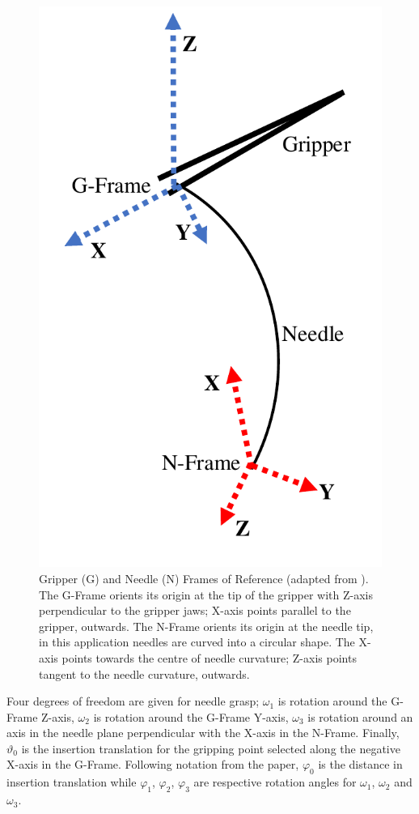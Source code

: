 \documentclass[english]{sobraep}
\begin{document}
\begin{figure}
    \centering
    \includegraphics[scale=0.4]{figs/needle-frames.pdf}
    \caption{Gripper (G) and Needle (N) Frames of Reference (adapted from \cite[Figure 2(a)]{needle-grasp}). The G-Frame orients its origin at the tip of the gripper with Z-axis perpendicular to the gripper jaws; X-axis points parallel to the gripper, outwards. The N-Frame orients its origin at the needle tip, in this application needles are curved into a circular shape. The X-axis points towards the centre of needle curvature; Z-axis points tangent to the needle curvature, outwards.}
    \label{fig:needle-frames}
\end{figure}
\par{Four degrees of freedom are given for needle grasp; $\omega_{1}$ is rotation around the G-Frame Z-axis, $\omega_{2}$ is rotation around the G-Frame Y-axis, $\omega_{3}$ is rotation around an axis in the needle plane perpendicular with the X-axis in the N-Frame. Finally, $\vartheta_{0}$ is the insertion translation for the gripping point selected along the negative X-axis in the G-Frame. Following notation from the paper, $\varphi_0$ is the distance in insertion translation while $\varphi_1$, $\varphi_2$, $\varphi_3$ are respective rotation angles for $\omega_{1}$, $\omega_{2}$ and $\omega_{3}$.}
\end{document}
